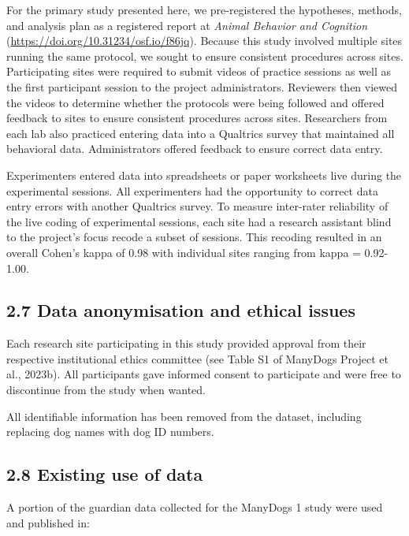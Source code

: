 \documentclass[
  man,floatsintext]{apa6}
\begin{document}
For the primary study presented here, we pre-registered the hypotheses, methods, and analysis plan as a registered report at \emph{Animal Behavior and Cognition} (\url{https://doi.org/10.31234/osf.io/f86jq}). Because this study involved multiple sites running the same protocol, we sought to ensure consistent procedures across sites. Participating sites were required to submit videos of practice sessions as well as the first participant session to the project administrators. Reviewers then viewed the videos to determine whether the protocols were being followed and offered feedback to sites to ensure consistent procedures across sites. Researchers from each lab also practiced entering data into a Qualtrics survey that maintained all behavioral data. Administrators offered feedback to ensure correct data entry.

Experimenters entered data into spreadsheets or paper worksheets live during the experimental sessions. All experimenters had the opportunity to correct data entry errors with another Qualtrics survey. To measure inter-rater reliability of the live coding of experimental sessions, each site had a research assistant blind to the project's focus recode a subset of sessions. This recoding resulted in an overall Cohen's kappa of 0.98 with individual sites ranging from kappa = 0.92-1.00.

\hypertarget{data-anonymisation-and-ethical-issues}{%
\subsection{2.7 Data anonymisation and ethical issues}\label{data-anonymisation-and-ethical-issues}}

Each research site participating in this study provided approval from their respective institutional ethics committee (see Table S1 of ManyDogs Project et al., 2023b). All participants gave informed consent to participate and were free to discontinue from the study when wanted.

All identifiable information has been removed from the dataset, including replacing dog names with dog ID numbers.

\hypertarget{existing-use-of-data}{%
\subsection{2.8 Existing use of data}\label{existing-use-of-data}}

A portion of the guardian data collected for the ManyDogs 1 study were used and published in:
\end{document}
